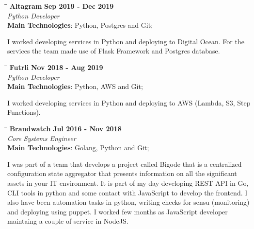 \documentclass[margin]{res}
\begin{document}
\begin{resume}
\vspace{-0.1in}
   \begin{tabbing}
   \hspace{2.3in}\= \hspace{1.7in}\= \kill
    \textbf{Altagram}    \>\>\textbf{Sep 2019 - Dec 2019}\\
    \textit{Python Developer}\\        
    \textbf{Main Technologies}: Python, Postgres and Git;
   \end{tabbing}\vspace{-20pt}
    \vspace{2mm}
I worked developing services in Python and deploying to Digital Ocean. For the services the team
made use of Flask Framework and Postgres database.

\vspace{-0.1in}
   \begin{tabbing}
   \hspace{2.3in}\= \hspace{1.7in}\= \kill
    \textbf{Futrli}    \>\>\textbf{Nov 2018 - Aug 2019}\\
    \textit{Python Developer}\\        
    \textbf{Main Technologies}: Python, AWS and Git;
   \end{tabbing}\vspace{-20pt}
    \vspace{2mm}
I worked developing services in Python and deploying to AWS (Lambda, S3, Step Functions).

\vspace{-0.1in}
   \begin{tabbing}
   \hspace{2.3in}\= \hspace{1.7in}\= \kill
    \textbf{Brandwatch}    \>\>\textbf{Jul 2016 - Nov 2018}\\
    \textit{Core Systems Engineer}\\        
    \textbf{Main Technologies}: Golang, Python and Git;
   \end{tabbing}\vspace{-20pt}
    \vspace{2mm}
I was part of a team that develops a project called Bigode that is a centralized configuration state
aggregator that presents information on all the significant assets in your IT environment. It is
part of my day developing REST API in Go, CLI tools in python and some contact with JavaScript to develop the frontend.
I also have been automation tasks in python, writing checks for sensu (monitoring) and deploying using puppet.
I worked few months as JavaScript developer maintaing a couple of service in NodeJS.


\end{resume}
\end{document}

